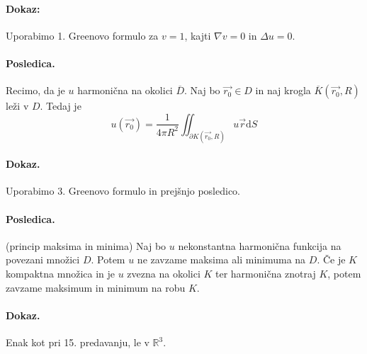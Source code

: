 \documentclass[a4paper]{article}
\newcommand{\vct}[1]{\overrightarrow{#1}}
\newcommand{\dif}{\mathrm{d}}
\newcommand{\R}{\mathbb{R}}
\begin{document}
\paragraph{Dokaz:} Uporabimo 1. Greenovo formulo za $v = 1$, kajti $\nabla v = 0$ in $\Delta u = 0$.
\paragraph{Posledica.} Recimo, da je $u$ harmonična na okolici $\overline{D}$. Naj bo $\vct{r_0} \in D$ in naj krogla $\overline{K}(\vct{r_0}, R)$ leži v $D$. Tedaj je
$$u(\vct{r_0}) = \frac{1}{4\pi R^2} \iint_{\partial K(\vct{r_0}, R)}u\vct{r}\dif S$$
\paragraph{Dokaz.} Uporabimo 3. Greenovo formulo in prejšnjo posledico.
\paragraph{Posledica.} (princip maksima in minima) Naj bo $u$ nekonstantna harmonična funkcija na povezani množici $D$. Potem $u$ ne zavzame maksima ali minimuma na $D$.
Če je $K$ kompaktna množica in je $u$ zvezna na okolici $K$ ter harmonična znotraj $K$, potem zavzame maksimum in minimum na robu $K$.
\paragraph{Dokaz.} Enak kot pri 15. predavanju, le v $\R^3$.
\end{document}
